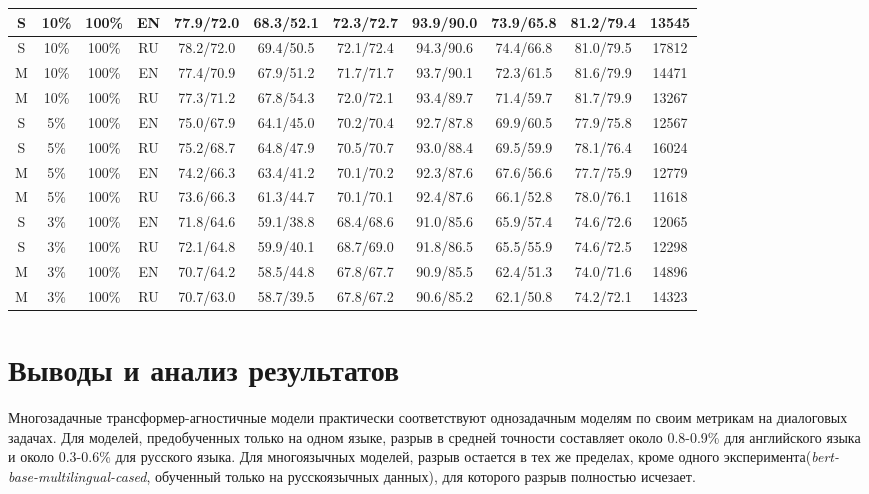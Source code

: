\begin{table*}
{\begin{tabular}{|c|c|c|c||c|c|c|c|c|c||c|}
 S & 10\% & 100\% & EN & 77.9/72.0 & 68.3/52.1 & 72.3/72.7 & 93.9/90.0 & 73.9/65.8 & 81.2/79.4 & 13545 \\ \hline
 S & 10\% & 100\% & RU & 78.2/72.0 & 69.4/50.5 & 72.1/72.4 & 94.3/90.6 & 74.4/66.8 & 81.0/79.5 & 17812 \\ \hline 
M & 10\% & 100\% & EN & 77.4/70.9 & 67.9/51.2 & 71.7/71.7 & 93.7/90.1 & 72.3/61.5 & 81.6/79.9 & 14471 \\ \hline 
M & 10\% & 100\% & RU & 77.3/71.2 & 67.8/54.3 & 72.0/72.1 & 93.4/89.7 & 71.4/59.7 & 81.7/79.9 & 13267 \\ \hline
 S & 5\% & 100\% & EN & 75.0/67.9 & 64.1/45.0 & 70.2/70.4 & 92.7/87.8 & 69.9/60.5 & 77.9/75.8 & 12567 \\ \hline 
S & 5\% & 100\% & RU & 75.2/68.7 & 64.8/47.9 & 70.5/70.7 & 93.0/88.4 & 69.5/59.9 & 78.1/76.4 & 16024 \\ \hline 
M & 5\% & 100\% & EN & 74.2/66.3 & 63.4/41.2 & 70.1/70.2 & 92.3/87.6 & 67.6/56.6 & 77.7/75.9 & 12779 \\ \hline 
M & 5\% & 100\% & RU & 73.6/66.3 & 61.3/44.7 & 70.1/70.1 & 92.4/87.6 & 66.1/52.8 & 78.0/76.1 & 11618 \\ \hline
 S & 3\% & 100\% & EN & 71.8/64.6 & 59.1/38.8 & 68.4/68.6 & 91.0/85.6 & 65.9/57.4 & 74.6/72.6 & 12065 \\ \hline
 S & 3\% & 100\% & RU & 72.1/64.8 & 59.9/40.1 & 68.7/69.0 & 91.8/86.5 & 65.5/55.9 & 74.6/72.5 & 12298 \\ \hline
 M & 3\% & 100\% & EN & 70.7/64.2 & 58.5/44.8 & 67.8/67.7 & 90.9/85.5 & 62.4/51.3 & 74.0/71.6 & 14896 \\ \hline 
M & 3\% & 100\% & RU & 70.7/63.0 & 58.7/39.5 & 67.8/67.2 & 90.6/85.2 & 62.1/50.8 & 74.2/72.1 & 14323 \\ \hline \end{tabular} } \end{table*} 
\fi

\section{Выводы и анализ результатов}
Многозадачные трансформер-агностичные модели практически соответствуют однозадачным моделям по своим метрикам на диалоговых задачах. Для моделей, предобученных только на одном языке, разрыв в средней точности составляет около 0.8-0.9\% для английского языка и около 0.3-0.6\% для русского языка. Для многоязычных моделей, разрыв остается в тех же пределах, кроме одного эксперимента(\textit{bert-base-multilingual-cased}, обученный только на русскоязычных данных), для которого разрыв полностью исчезает.

